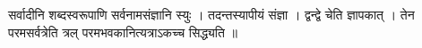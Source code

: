 सर्वादीनि शब्दस्वरूपाणि सर्वनामसंज्ञानि स्युः । तदन्तस्यापीयं संज्ञा ।
द्वन्द्वे चेति ज्ञापकात् । तेन परमसर्वत्रेति त्रल् परमभवकानित्यत्राऽकच्च
सिद्ध्यति ॥
